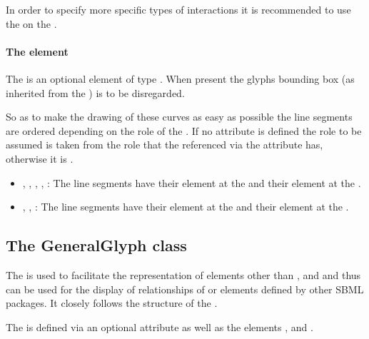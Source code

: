 In order to specify more specific types of interactions it is recommended to use the  on the \SpeciesReference.

\paragraph{The  element}
The  is an optional element of type \Curve. When present 
the glyphs bounding box (as inherited from the \GraphicalObject) is to 
be disregarded. 

So as to make the drawing of these curves as easy as possible the line 
segments are ordered depending on the role of the 
\SpeciesReferenceGlyph. If no  attribute is defined the role 
to be assumed is taken from the role that the \SpeciesReference 
referenced via the attribute  has, otherwise it 
is . 


\begin{itemize}
	\item {, , , 
	, : The line segments have their 
	 element at the \ReactionGlyph and their  
	element at the \SpeciesGlyph.} 
	\item {, 
	, : The line segments have their 
	 element at the \SpeciesGlyph and their  element 
	at the \ReactionGlyph.} 
\end{itemize}

\subsection{The GeneralGlyph class}
\label{generalglyph-class}
The \GeneralGlyph is used to facilitate the representation of elements 
other than \Compartment, \Species and \Reaction and thus can be used for 
the display of relationships of \Rule or elements defined by other SBML 
packages. It closely follows the structure of the \ReactionGlyph. 

The \GeneralGlyph is defined via an optional attribute  
as well as the elements ,  and 
. 


